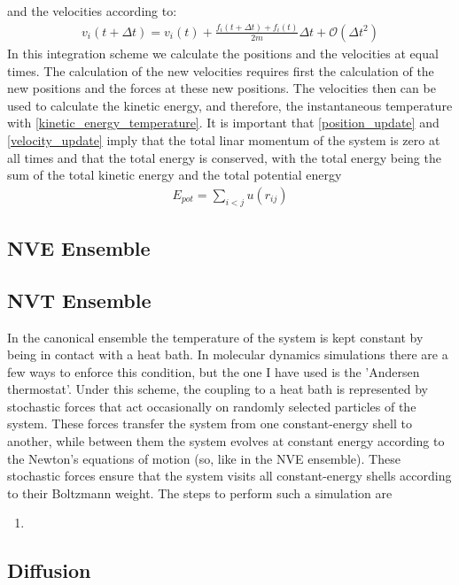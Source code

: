 \documentclass[11pt]{article}
\begin{document}
\begin{enumerate}
			and the velocities according to:
		\begin{align}
			v_i(t+\Delta t)=v_i(t)+\frac{f_i(t+\Delta t)+f_i(t)}{2m}\Delta t + \mathcal{O}(\Delta t^2)
			\label{velocity_update}
		\end{align}
		In this integration scheme we calculate the positions and the velocities at equal times. The calculation of the new velocities requires first the calculation of the new positions and the forces at these new positions.
		The velocities then can be used to calculate the kinetic energy, and therefore, the instantaneous temperature with \eqref{kinetic_energy_temperature}. It is important that \eqref{position_update} and \eqref{velocity_update} imply that the total linar momentum of the system is zero at all times and that the total energy is conserved, with the total energy being the sum of the total kinetic energy and the total potential energy
		\begin{align}
			E_{pot}=\sum_{i<j}u(r_{ij})
		\end{align}
\end{enumerate}


\subsection{NVE Ensemble}


\subsection{NVT Ensemble}


In the canonical ensemble the temperature of the system is kept constant by being in contact with a heat bath. In molecular dynamics simulations there are a few ways to enforce this condition, but the one I have used is the 'Andersen thermostat'. Under this scheme, the coupling to a heat bath is represented by stochastic forces that act occasionally on randomly selected particles of the system. These forces transfer the system from one constant-energy shell to another, while between them the system evolves at constant energy according to the Newton's equations of motion (so, like in the NVE ensemble). These stochastic forces ensure that the system visits all constant-energy shells according to their Boltzmann weight. The steps to perform such a simulation are
\begin{enumerate}
	\item 
\end{enumerate}


\subsection{Diffusion}
\end{document}
